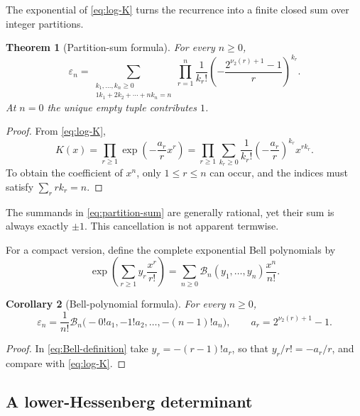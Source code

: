\documentclass[11pt,oneside]{article}
\newtheorem{theorem}{Theorem}[section]
\newtheorem{corollary}[theorem]{Corollary}
\theoremstyle{definition}
\theoremstyle{remark}
\newcommand{\vtwo}{\nu_2}
\newcommand{\Bell}{\mathcal B}
\begin{document}
The exponential of \eqref{eq:log-K} turns the recurrence into a finite closed
sum over integer partitions.

\begin{theorem}[Partition-sum formula]
\label{thm:partition-sum}
For every $n\ge0$,
\begin{equation}
 \boxed{\displaystyle
 \varepsilon_n=
 \sum_{\substack{k_1,\ldots,k_n\ge0\\
                  1k_1+2k_2+\cdots+nk_n=n}}
 \prod_{r=1}^{n}
 \frac1{k_r!}
 \left(-\frac{2^{\vtwo(r)+1}-1}{r}\right)^{k_r}.}          \label{eq:partition-sum}
\end{equation}
At $n=0$ the unique empty tuple contributes $1$.
\end{theorem}

\begin{proof}
From \eqref{eq:log-K},
\[
 K(x)=\prod_{r\ge1}
 \exp\left(-\frac{a_r}{r}x^r\right)
 =\prod_{r\ge1}\sum_{k_r\ge0}
   \frac1{k_r!}\left(-\frac{a_r}{r}\right)^{k_r}x^{rk_r}.
\]
To obtain the coefficient of $x^n$, only $1\le r\le n$ can occur, and the
indices must satisfy $\sum_r rk_r=n$.
\end{proof}

The summands in \eqref{eq:partition-sum} are generally rational, yet their sum
is always exactly $\pm1$.  This cancellation is not apparent termwise.

For a compact version, define the complete exponential Bell polynomials by
\begin{equation}
 \exp\left(\sum_{r\ge1}y_r\frac{x^r}{r!}\right)
 =\sum_{n\ge0}\Bell_n(y_1,\ldots,y_n)\frac{x^n}{n!}.       \label{eq:Bell-definition}
\end{equation}

\begin{corollary}[Bell-polynomial formula]
\label{cor:Bell-formula}
For every $n\ge0$,
\begin{equation}
 \boxed{\displaystyle
 \varepsilon_n=\frac1{n!}\Bell_n
 \bigl(-0!a_1,-1!a_2,\ldots,-(n-1)!a_n\bigr),
 \qquad a_r=2^{\vtwo(r)+1}-1.}                             \label{eq:Bell-formula}
\end{equation}
\end{corollary}

\begin{proof}
In \eqref{eq:Bell-definition} take $y_r=-(r-1)!a_r$, so that
$y_r/r!=-a_r/r$, and compare with \eqref{eq:log-K}.
\end{proof}

\subsection{A lower-Hessenberg determinant}
\end{document}
